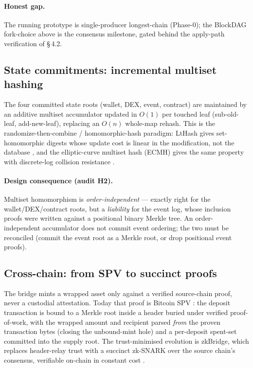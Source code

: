 \paragraph{Honest gap.} The running prototype is single-producer longest-chain
(Phase-0); the BlockDAG fork-choice above is the consensus milestone, gated
behind the apply-path verification of \S\,4.2.

\subsection{State commitments: incremental multiset hashing}
The four committed state roots (wallet, DEX, event, contract) are maintained by
an additive multiset accumulator updated in $O(1)$ per touched leaf
(sub-old-leaf, add-new-leaf), replacing an $O(n)$ whole-map rehash. This is the
randomize-then-combine / homomorphic-hash paradigm: LtHash gives set-homomorphic
digests whose update cost is linear in the modification, not the database
\cite{lthash2019}, and the elliptic-curve multiset hash (ECMH) gives the same
property with discrete-log collision resistance \cite{ecmh2016}.

\paragraph{Design consequence (audit H2).} Multiset homomorphism is
\emph{order-independent} — exactly right for the wallet/DEX/contract roots, but a
\emph{liability} for the event log, whose inclusion proofs were written against a
positional binary Merkle tree. An order-independent accumulator does not commit
event ordering; the two must be reconciled (commit the event root as a Merkle
root, or drop positional event proofs).

\subsection{Cross-chain: from SPV to succinct proofs}
The bridge mints a wrapped asset only against a verified source-chain proof,
never a custodial attestation. Today that proof is Bitcoin SPV
\cite{nakamoto2008}: the deposit transaction is bound to a Merkle root inside a
header buried under verified proof-of-work, with the wrapped amount and recipient
parsed \emph{from} the proven transaction bytes (closing the unbound-mint hole)
and a per-deposit spent-set committed into the supply root. The trust-minimised
evolution is zkBridge, which replaces header-relay trust with a succinct
zk-SNARK over the source chain's consensus, verifiable on-chain in constant cost
\cite{zkbridge2022}.

